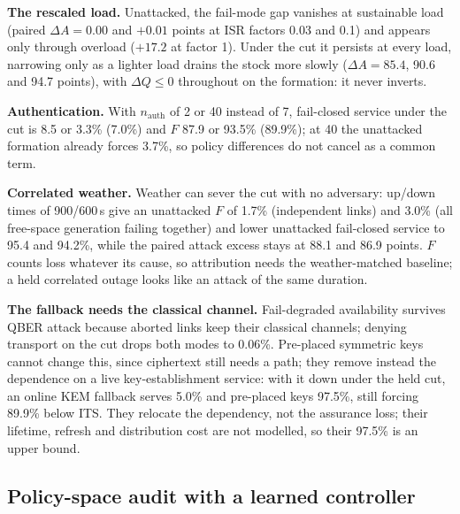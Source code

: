 \documentclass[conference,a4paper]{IEEEtran}
\begin{document}
\textbf{The rescaled load.} Unattacked, the fail-mode gap
vanishes at sustainable load (paired $\Delta A=0.00$ and $+0.01$ points at ISR
factors 0.03 and 0.1) and appears only through overload ($+17.2$ at factor 1). Under the cut it persists at every load, narrowing only as a lighter load
drains the stock more slowly ($\Delta A=85.4$, 90.6 and 94.7 points), with $\Delta Q\le0$ throughout on the formation: it never inverts.

\textbf{Authentication.} With $n_{\mathrm{auth}}$ of 2 or 40 instead of 7,
fail-closed service under the cut is 8.5 or 3.3\% (7.0\%) and $F$ 87.9 or 93.5\%
(89.9\%); at 40 the unattacked formation already forces 3.7\%, so policy differences
do not cancel as a common term.

\textbf{Correlated weather.} Weather can sever the cut with no adversary: up/down
times of 900/600\,s give an unattacked $F$ of 1.7\% (independent links) and 3.0\%
(all free-space generation failing together) and lower unattacked fail-closed service to 95.4 and 94.2\%, while the paired attack excess stays at 88.1 and 86.9 points. $F$ counts loss whatever its cause, so attribution needs the
weather-matched baseline; a held correlated outage looks like an attack of the same duration.

\textbf{The fallback needs the classical channel.} Fail-degraded
availability survives QBER attack because aborted links keep their classical
channels; denying transport on the cut drops both modes to 0.06\%. Pre-placed
symmetric keys cannot change this, since ciphertext still needs a path; they remove
instead the dependence on a live key-establishment service: with it down under the held cut, an online KEM fallback serves 5.0\% and pre-placed keys 97.5\%, still forcing 89.9\% below
ITS. They relocate the dependency, not the assurance loss; their lifetime, refresh and distribution cost are not modelled, so their 97.5\% is an upper bound.

\subsection{Policy-space audit with a learned controller}\label{sec:audit}
\begin{table}[t]
\caption{Learned grade controllers against the budget-greedy heuristic on the frozen
test set (seven conditions, twelve held-out seeds): paired differences, 95\%
intervals; $J$ in $10^{-3}$, others in points. $^\ast$Never below the floor; also the 24\,h nominal result.}
\label{tab:learn}
\centering\footnotesize
\setlength{\tabcolsep}{1.2pt}

\end{table}
\end{document}
